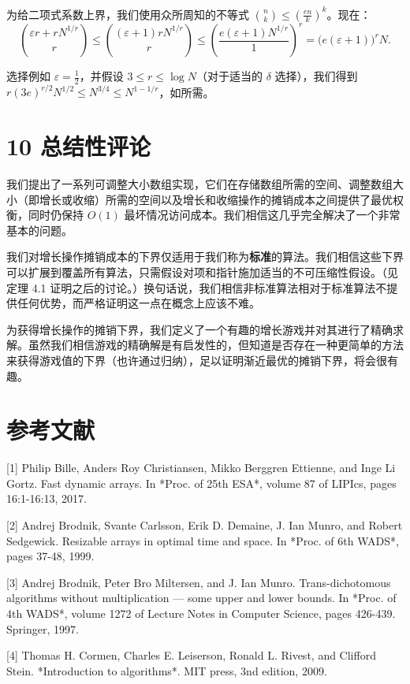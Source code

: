 \documentclass[12pt,a4paper]{ctexart}
\theoremstyle{remark}
\begin{document}
为给二项式系数上界，我们使用众所周知的不等式 $\binom{n}{k}\leq\left(\frac{en}{k}\right)^k$。现在：
$$\binom{\varepsilon r+rN^{1/r}}{r} \leq \binom{(\varepsilon+1)rN^{1/r}}{r} \leq \left(\frac{e(\varepsilon+1)N^{1/r}}{1}\right)^r = \big(e(\varepsilon+1)\big)^r N.$$

选择例如 $\varepsilon=\frac{1}{2}$，并假设 $3\leq r\leq\log N$（对于适当的 $\delta$ 选择），我们得到 $r(3e)^{r/2}N^{1/2}\leq N^{3/4}\leq N^{1-1/r}$，如所需。

\section{10 总结性评论}

我们提出了一系列可调整大小数组实现，它们在存储数组所需的空间、调整数组大小（即增长或收缩）所需的空间以及增长和收缩操作的摊销成本之间提供了最优权衡，同时仍保持 $O(1)$ 最坏情况访问成本。我们相信这几乎完全解决了一个非常基本的问题。

我们对增长操作摊销成本的下界仅适用于我们称为\textbf{标准}的算法。我们相信这些下界可以扩展到覆盖所有算法，只需假设对项和指针施加适当的不可压缩性假设。（见定理 4.1 证明之后的讨论。）换句话说，我们相信非标准算法相对于标准算法不提供任何优势，而严格证明这一点在概念上应该不难。

为获得增长操作的摊销下界，我们定义了一个有趣的增长游戏并对其进行了精确求解。虽然我们相信游戏的精确解是有启发性的，但知道是否存在一种更简单的方法来获得游戏值的下界（也许通过归纳），足以证明渐近最优的摊销下界，将会很有趣。

\section{参考文献}

[1] Philip Bille, Anders Roy Christiansen, Mikko Berggren Ettienne, and Inge Li Gortz. Fast dynamic arrays. In *Proc. of 25th ESA*, volume 87 of LIPIcs, pages 16:1-16:13, 2017.

[2] Andrej Brodnik, Svante Carlsson, Erik D. Demaine, J. Ian Munro, and Robert Sedgewick. Resizable arrays in optimal time and space. In *Proc. of 6th WADS*, pages 37-48, 1999.

[3] Andrej Brodnik, Peter Bro Miltersen, and J. Ian Munro. Trans-dichotomous algorithms without multiplication --- some upper and lower bounds. In *Proc. of 4th WADS*, volume 1272 of Lecture Notes in Computer Science, pages 426-439. Springer, 1997.

[4] Thomas H. Cormen, Charles E. Leiserson, Ronald L. Rivest, and Clifford Stein. *Introduction to algorithms*. MIT press, 3nd edition, 2009.
\end{document}
